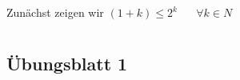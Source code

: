 \documentclass[12pt,a4paper]{report}
\begin{document}
	Zunächst zeigen wir $ (1+k) \leq 2^k $ ~~ $ \forall k \in N$

\appendices
	\chapter{}
	\section{Übungsblatt 1}\label{uebungsblatt1}
	
\end{document}
